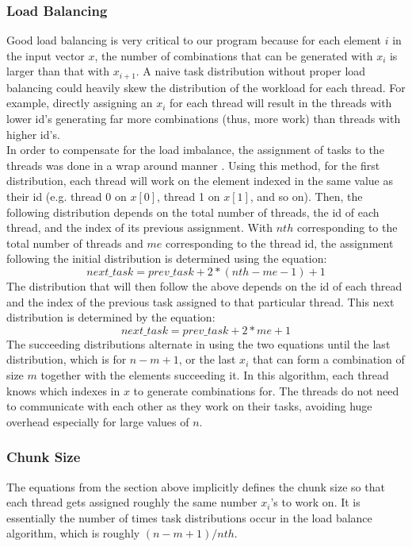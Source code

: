 \subsubsection{Load Balancing}
Good load balancing is very critical to our program because for each element $i$ in the input vector $x$, the number of combinations that can be generated with $x_{i}$ is larger than that with $x_{i+1}$. A naive task distribution without proper load balancing could heavily skew the distribution of the workload for each thread. For example, directly assigning an $x_{i}$ for each thread will result in the threads with lower id's generating far more combinations (thus, more work) than threads with higher id's.\\
\null
In order to compensate for the load imbalance, the assignment of tasks to the threads was done in a wrap around manner \cite{parallelalgorithm}. Using this method, for the first distribution, each thread will work on the element indexed in the same value as their id (e.g. thread 0 on $x[0]$, thread 1 on $x[1]$, and so on). Then, the following distribution depends on the total number of threads, the id of each thread, and the index of its previous assignment. With $nth$ corresponding to the total number of threads and $me$ corresponding to the thread id, the assignment following the initial distribution is determined using the equation:
\begin{equation}
next\_task = prev\_task + 2 * (nth - me - 1) + 1
\end{equation}
The distribution that will then follow the above depends on the id of each thread and the index of the previous task assigned to that particular thread. This next distribution is determined by the equation:
\begin{equation}
next\_task = prev\_task + 2 * me + 1
\end{equation}
The succeeding distributions alternate in using the two equations until the last distribution, which is for $n - m + 1$, or the last $x_{i}$ that can form a combination of size $m$ together with the elements succeeding it. In this algorithm, each thread knows which indexes in $x$ to generate combinations for. The threads do not need to communicate with each other as they work on their tasks, avoiding huge overhead especially for large values of $n$.

\subsubsection{Chunk Size}
The equations from the section above implicitly defines the chunk size so that each thread gets assigned roughly the same number $x_{i}$'s to work on. It is essentially the number of times task distributions occur in the load balance algorithm, which is roughly $(n-m+1)/nth$.

